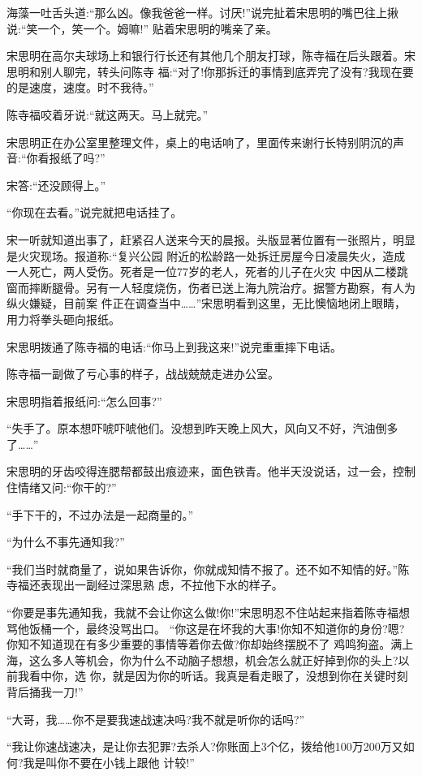 \documentclass[11pt,a4paper,onecolumn]{article}
\begin{document}
海藻一吐舌头道:``那么凶。像我爸爸一样。讨厌!''说完扯着宋思明的嘴巴往上揪说:``笑一个，笑一个。姆嘛!''
贴着宋思明的嘴亲了亲。

宋思明在高尔夫球场上和银行行长还有其他几个朋友打球，陈寺福在后头跟着。宋思明和别人聊完，转头问陈寺
福:``对了!你那拆迁的事情到底弄完了没有?我现在要的是速度，速度。时不我待。''

陈寺福咬着牙说:``就这两天。马上就完。''

宋思明正在办公室里整理文件，桌上的电话响了，里面传来谢行长特别阴沉的声音:``你看报纸了吗?''

宋答:``还没顾得上。''

``你现在去看。''说完就把电话挂了。

宋一听就知道出事了，赶紧召人送来今天的晨报。头版显著位置有一张照片，明显是火灾现场。报道称:``复兴公园
附近的松龄路一处拆迁房屋今日凌晨失火，造成一人死亡，两人受伤。死者是一位77岁的老人，死者的儿子在火灾
中因从二楼跳窗而摔断腿骨。另有一人轻度烧伤，伤者已送上海九院治疗。据警方勘察，有人为纵火嫌疑，目前案
件正在调查当中……''宋思明看到这里，无比懊恼地闭上眼睛，用力将拳头砸向报纸。

宋思明拨通了陈寺福的电话:``你马上到我这来!''说完重重摔下电话。

陈寺福一副做了亏心事的样子，战战兢兢走进办公室。

宋思明指着报纸问:``怎么回事?''

``失手了。原本想吓唬吓唬他们。没想到昨天晚上风大，风向又不好，汽油倒多了……''

宋思明的牙齿咬得连腮帮都鼓出痕迹来，面色铁青。他半天没说话，过一会，控制住情绪又问:``你干的?''

``手下干的，不过办法是一起商量的。''

``为什么不事先通知我?''

``我们当时就商量了，说如果告诉你，你就成知情不报了。还不如不知情的好。''陈寺福还表现出一副经过深思熟
虑，不拉他下水的样子。

``你要是事先通知我，我就不会让你这么做!你!''宋思明忍不住站起来指着陈寺福想骂他饭桶一个，最终没骂出口。
``你这是在坏我的大事!你知不知道你的身份?嗯?你知不知道现在有多少重要的事情等着你去做?你却始终摆脱不了
鸡鸣狗盗。满上海，这么多人等机会，你为什么不动脑子想想，机会怎么就正好掉到你的头上?以前我看中你，选
你，就是因为你的听话。我真是看走眼了，没想到你在关键时刻背后捅我一刀!''

``大哥，我……你不是要我速战速决吗?我不就是听你的话吗?''

``我让你速战速决，是让你去犯罪?去杀人?你账面上3个亿，拨给他100万200万又如何?我是叫你不要在小钱上跟他
计较!''
\end{document}

